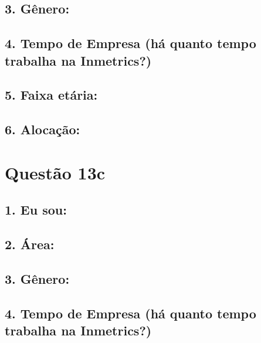 \documentclass[]{book}
\begin{document}
\hypertarget{genero-18}{%
\subsection{3. Gênero:}\label{genero-18}}

\hypertarget{tempo-de-empresa-ha-quanto-tempo-trabalha-na-inmetrics-18}{%
\subsection{4. Tempo de Empresa (há quanto tempo trabalha na Inmetrics?)}\label{tempo-de-empresa-ha-quanto-tempo-trabalha-na-inmetrics-18}}

\hypertarget{faixa-etaria-18}{%
\subsection{5. Faixa etária:}\label{faixa-etaria-18}}

\hypertarget{alocacao-18}{%
\subsection{6. Alocação:}\label{alocacao-18}}

\hypertarget{questao-13c}{%
\section{Questão 13c}\label{questao-13c}}

\hypertarget{eu-sou-19}{%
\subsection{1. Eu sou:}\label{eu-sou-19}}

\hypertarget{area-19}{%
\subsection{2. Área:}\label{area-19}}

\hypertarget{genero-19}{%
\subsection{3. Gênero:}\label{genero-19}}

\hypertarget{tempo-de-empresa-ha-quanto-tempo-trabalha-na-inmetrics-19}{%
\subsection{4. Tempo de Empresa (há quanto tempo trabalha na Inmetrics?)}\label{tempo-de-empresa-ha-quanto-tempo-trabalha-na-inmetrics-19}}
\end{document}
